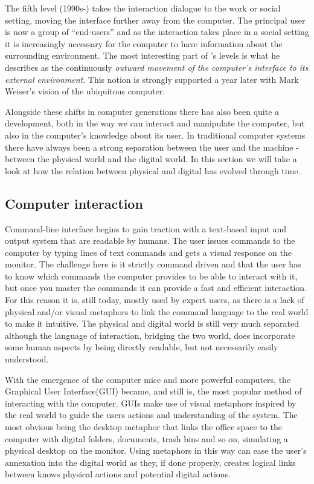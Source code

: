The fifth level (1990s-) takes the interaction dialogue to the work or social setting, moving the interface further away from the computer.
The principal user is now a group of ``end-users'' and as the interaction takes place in a social setting it is increasingly necessary for the computer to have information about the surrounding environment.
\blank
The most interesting part of \citeauthor{grudin1990computer}'s levels is what he describes as the continuously \emph{outward movement of the computer's interface to its external environment}.
This notion is strongly supported a year later with Mark Weiser's vision of the ubiquitous computer.

Alongside these shifts in computer generations there has also been quite a development, both in the way we can interact and manipulate the computer, but also in the computer's knowledge about its user.
In traditional computer systems there have always been a strong separation between the user and the machine - between the physical world and the digital world.
In this section we will take a look at how the relation between physical and digital has evolved through time.

\subsection{Computer interaction}
 
Command-line interface begins to gain traction with a text-based input and output system that are readable by humans.
The user issues commands to the computer by typing lines of text commands and gets a visual response on the monitor.
The challenge here is it strictly command driven and that the user has to know which commands the computer provides to be able to interact with it, but once you master the commands it can provide a fast and efficient interaction.
For this reason it is, still today, mostly used by expert users, as there is a lack of physical and/or visual metaphors to link the command language to the real world to make it intuitive.  
The physical and digital world is still very much separated although the language of interaction, bridging the two world, does incorporate some human aspects by being directly readable, but not necessarily easily understood.

With the emergence of the computer mice and more powerful computers, the Graphical User Interface(GUI) became, and still is, the most popular method of interacting with the computer.
GUIs make use of visual metaphors inspired by the real world to guide the users actions and understanding of the system.
The most obvious being the desktop metaphor that links the office space to the computer with digital folders, documents, trash bins and so on, simulating a physical desktop on the monitor.
Using metaphors in this way can ease the user's annexation into the digital world as they, if done properly, creates logical links between knows physical actions and potential digital actions.

